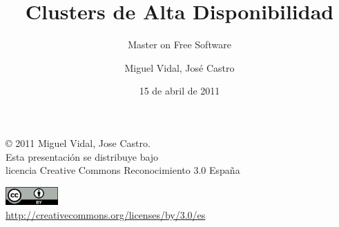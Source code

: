 \documentclass{beamer}
\begin{document}
\title{Clusters de Alta Disponibilidad}
\subtitle{Master on Free Software}
\author{Miguel Vidal, José Castro}
\date{15 de abril de 2011}


\begin{frame}
  \vspace{2cm}
  \begin{flushright}
    {\footnotesize \copyright{} 2011 Miguel Vidal, Jose Castro.} \\
    \medskip
    {\scriptsize Esta presentación se distribuye bajo \\ licencia Creative Commons Reconocimiento 3.0 España}
  \end{flushright}
  \begin{center}
    \href{http://creativecommons.org/licenses/by/3.0/es}{\includegraphics[width=2cm]{format/cc-by.png}} \\
    {\tiny \url{http://creativecommons.org/licenses/by/3.0/es}}
  \end{center}
\end{frame}%


\normalsize


\end{document}
